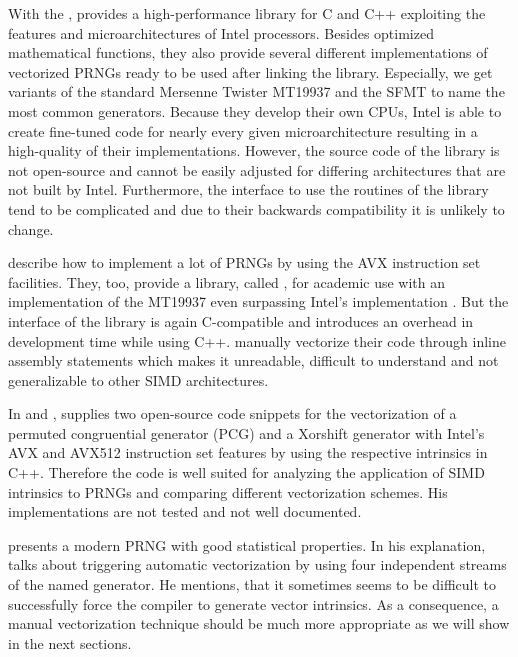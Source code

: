 \documentclass{stdlocal}
\begin{document}
  With the , \citeauthor{intel-mkl} provides a high-performance library for C and C++ exploiting the features and microarchitectures of Intel processors.
  Besides optimized mathematical functions, they also provide several different implementations of vectorized PRNGs ready to be used after linking the library.
  Especially, we get variants of the standard Mersenne Twister MT19937 and the SFMT to name the most common generators.
  Because they develop their own CPUs, Intel is able to create fine-tuned code for nearly every given microarchitecture resulting in a high-quality of their implementations.
  However, the source code of the library is not open-source and cannot be easily adjusted for differing architectures that are not built by Intel.
  Furthermore, the interface to use the routines of the library tend to be complicated and due to their backwards compatibility it is unlikely to change.
  \autocite{intel-mkl}

  \textcite{barash2017} describe how to implement a lot of PRNGs by using the AVX instruction set facilities.
  They, too, provide a library, called , for academic use with an implementation of the MT19937 even surpassing Intel's implementation \autocite{guskova2016}.
  But the interface of the library is again C-compatible and introduces an overhead in development time while using C++.
  \citeauthor{barash2017} manually vectorize their code through inline assembly statements which makes it unreadable, difficult to understand and not generalizable to other SIMD architectures.

  In \textcite{lemire-pcg} and \textcite{lemire-xorshift}, \citeauthor{lemire-pcg} supplies two open-source code snippets for the vectorization of a permuted congruential generator (PCG) and a Xorshift generator with Intel's AVX and AVX512 instruction set features by using the respective intrinsics in C++.
  Therefore the code is well suited for analyzing the application of SIMD intrinsics to PRNGs and comparing different vectorization schemes.
  His implementations are not tested and not well documented.

  \textcite{vigna-xoroshiro} presents a modern PRNG with good statistical properties.
  In his explanation, \citeauthor{vigna-xoroshiro} talks about triggering automatic vectorization by using four independent streams of the named generator.
  He mentions, that it sometimes seems to be difficult to successfully force the compiler to generate vector intrinsics.
  As a consequence, a manual vectorization technique should be much more appropriate as we will show in the next sections.
\end{document}
